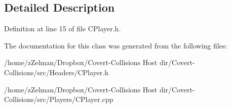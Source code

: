 \subsection{Detailed Description}


Definition at line 15 of file C\-Player.\-h.



The documentation for this class was generated from the following files\-:\begin{DoxyCompactItemize}
\item 
/home/z\-Zelman/\-Dropbox/\-Covert-\/\-Collisions Host dir/\-Covert-\/\-Collisions/src/\-Headers/C\-Player.\-h\item 
/home/z\-Zelman/\-Dropbox/\-Covert-\/\-Collisions Host dir/\-Covert-\/\-Collisions/src/\-Players/C\-Player.\-cpp\end{DoxyCompactItemize}
